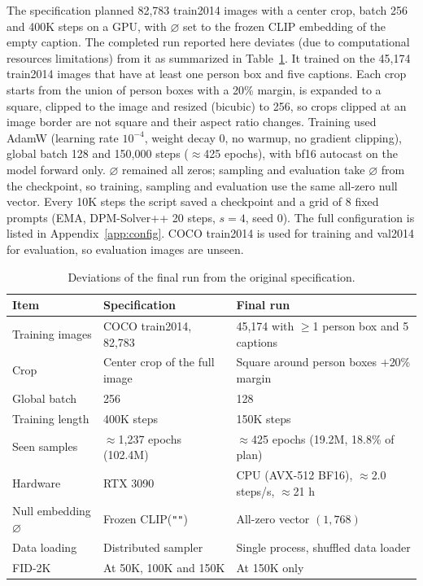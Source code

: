 \documentclass{article}
\newcommand{\nullemb}{\varnothing}
\begin{document}
The specification planned 82,783 train2014 images with a center crop, batch 256 and 400K steps on a GPU, with $\nullemb$ set to the frozen CLIP embedding of the empty caption.
The completed run reported here deviates (due to computational resources limitations) from it as summarized in Table~\ref{tab:deviations}.
It trained on the 45,174 train2014 images that have at least one person box and five captions.
Each crop starts from the union of person boxes with a 20\% margin, is expanded to a square, clipped to the image and resized (bicubic) to 256, so crops clipped at an image border are not square and their aspect ratio changes.
Training used AdamW (learning rate $10^{-4}$, weight decay 0, no warmup, no gradient clipping), global batch 128 and 150,000 steps ($\approx$425 epochs), with bf16 autocast on the model forward only.
$\nullemb$ remained all zeros; sampling and evaluation take $\nullemb$ from the checkpoint, so training, sampling and evaluation use the same all-zero null vector.
Every 10K steps the script saved a checkpoint and a grid of 8 fixed prompts (EMA, DPM-Solver++ 20 steps, $s=4$, seed 0).
The full configuration is listed in Appendix~\ref{app:config}.
COCO train2014 is used for training and val2014 for evaluation, so evaluation images are unseen.

\begin{table}[t]
  \caption{Deviations of the final run from the original specification.}
  \label{tab:deviations}
  \centering
  \small
  \begin{tabular}{@{}lll@{}}
    \toprule
    Item & Specification & Final run \\
    \midrule
    Training images & COCO train2014, 82,783 & 45,174 with $\geq$1 person box and 5 captions \\
    Crop & Center crop of the full image & Square around person boxes $+$20\% margin \\
    Global batch & 256 & 128 \\
    Training length & 400K steps & 150K steps \\
    Seen samples & $\approx$1,237 epochs (102.4M) & $\approx$425 epochs (19.2M, 18.8\% of plan) \\
    Hardware & RTX 3090 & CPU (AVX-512 BF16), $\approx$2.0 steps/s, $\approx$21 h \\
    Null embedding $\nullemb$ & Frozen CLIP(\texttt{""}) & All-zero vector $(1,768)$ \\
    Data loading & Distributed sampler & Single process, shuffled data loader \\
    FID-2K & At 50K, 100K and 150K & At 150K only \\
    \bottomrule
  \end{tabular}
\end{table}
\end{document}
